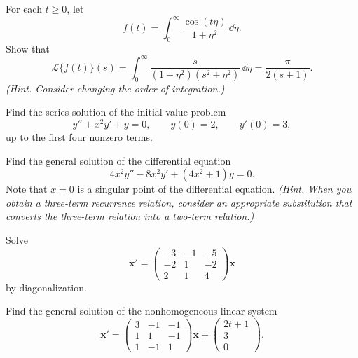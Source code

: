 \begin{problem}
For each $t\ge0$, let
\[
f(t)=\int_0^\infty \frac{\cos(t\eta)}{1+\eta^2}\,\dd\eta.
\]
Show that
\[
\mathcal{L}\{f(t)\}(s)
=\int_0^\infty \frac{s}{(1+\eta^2)(s^2+\eta^2)}\,\dd\eta
=\frac{\pi}{2(s+1)}.
\]
\textit{(Hint. Consider changing the order of integration.)}
\end{problem}

\begin{problem}
Find the series solution of the initial-value problem
\[
y''+x^2y'+y=0,
\qquad
y(0)=2,
\qquad
y'(0)=3,
\]
up to the first four nonzero terms.
\end{problem}

\begin{problem}
Find the general solution of the differential equation
\[
4x^2y''-8x^2y'+(4x^2+1)y=0.
\]
Note that $x=0$ is a singular point of the differential equation. \textit{(Hint. When you obtain a three-term recurrence relation, consider an appropriate substitution that converts the three-term relation into a two-term relation.)}
\end{problem}

\begin{problem}
Solve
\[
\mathbf x'=
\begin{pmatrix}
-3&-1&-5\\
-2&1&-2\\
2&1&4
\end{pmatrix}\mathbf x
\]
by diagonalization.
\end{problem}

\begin{problem}
Find the general solution of the nonhomogeneous linear system
\[
\mathbf x'=
\begin{pmatrix}
3&-1&-1\\
1&1&-1\\
1&-1&1
\end{pmatrix}\mathbf x
+
\begin{pmatrix}
2t+1\\
3\\
0
\end{pmatrix}.
\]
\end{problem}

